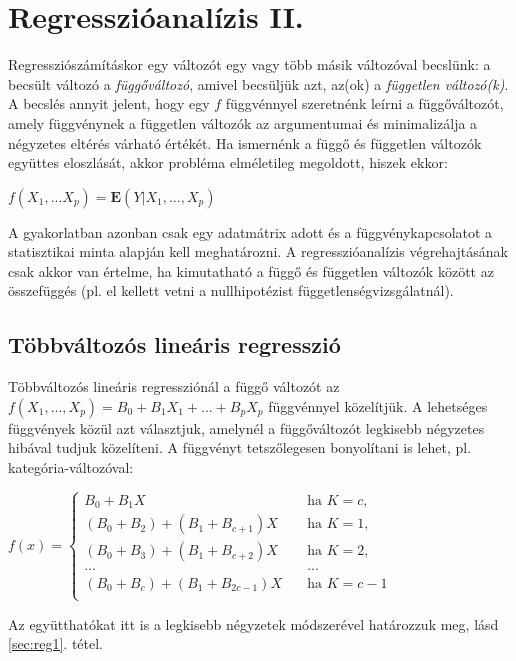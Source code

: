 \chapter{Regresszióanalízis II.}

Regressziószámításkor egy változót egy vagy több másik változóval becslünk: a becsült változó a \emph{függőváltozó}, amivel becsüljük azt, az(ok) a \emph{független változó(k)}. A becslés annyit jelent, hogy egy $f$ függvénnyel szeretnénk leírni a függőváltozót, amely függvénynek a független változók az argumentumai és minimalizálja a négyzetes eltérés várható értékét. Ha ismernénk a függő és független változók együttes eloszlását, akkor probléma elméletileg megoldott, hiszek ekkor:

$f(X_1,...X_p) = \mathbf{E}(Y| X_1, ..., X_p)$

A gyakorlatban azonban csak egy adatmátrix adott és a függvénykapcsolatot a statisztikai minta alapján kell meghatározni. A regresszióanalízis végrehajtásának csak akkor van értelme, ha kimutatható a függő és független változók között az összefüggés (pl. el kellett vetni a nullhipotézist függetlenségvizsgálatnál).

\section{Többváltozós lineáris regresszió}

Többváltozós lineáris regressziónál a függő változót az $f(X_1, ...,X_p)= B_0 + B_1X_1 + ... + B_pX_p$ függvénnyel közelítjük. A lehetséges függvények közül azt választjuk, amelynél a függőváltozót legkisebb négyzetes hibával tudjuk közelíteni. A függvényt tetszőlegesen bonyolítani is lehet, pl. kategória-változóval:

$f(x) = 
  \begin{cases}
    B_0 + B_1X       & \quad \text{ha } K=c, \\
    (B_0 + B_2) + (B_1+ B_{c+1})X  & \quad \text{ha } K =1,\\
    (B_0 + B_3) + (B_1+ B_{c+2})X  & \quad \text{ha } K =2,\\
    ... & \quad ...\\
    (B_0 + B_c) + (B_1+ B_{2c-1})X  & \quad \text{ha } K =c-1\\
  \end{cases}
$

Az együtthatókat itt is a legkisebb négyzetek módszerével határozzuk meg, lásd \ref{sec:reg1}. tétel.

